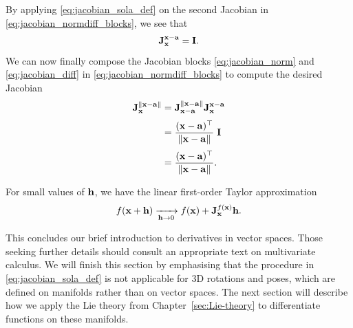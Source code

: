 \begin{example}[frametitle=Computing the Jacobian $\jac{\norm{\vecx - \veca}}{\vecx}$]
\begin{subequations}
\end{subequations}
By applying \eqref{eq:jacobian_sola_def} on the second Jacobian in \eqref{eq:jacobian_normdiff_blocks}, we see that
\begin{equation} \label{eq:jacobian_diff}
  \jac{\vecx - \veca}{\vecx} = \matI.
\end{equation}
We can now finally compose the Jacobian blocks \eqref{eq:jacobian_norm} and \eqref{eq:jacobian_diff} in \eqref{eq:jacobian_normdiff_blocks} to compute the desired Jacobian 
\begin{subequations} \label{eq:jacobian_normdiff}
\begin{align}
  \jac{\norm{\vecx - \veca}}{\vecx} 
  &= \jac{\norm{\vecx - \veca}}{\vecx - \veca} \jac{\vecx - \veca}{\vecx}\\[0.3em]
  &= \frac{(\vecx - \veca)\trans}{\norm{\vecx - \veca}} \; \matI\\[0.3em]
  &= \frac{(\vecx - \veca)\trans}{\norm{\vecx - \veca}}.
\end{align}
\end{subequations}
\end{example}

For small values of $\vech$, we have the linear first-order Taylor approximation
\begin{equation} \label{eq:linear-approximation}
  f(\vecx + \vech) \xrightarrow[\vech \to 0]{} f(\vecx) + \jac{f(\vecx)}{\vecx} \vech.
\end{equation}

This concludes our brief introduction to derivatives in vector spaces.
Those seeking further details should consult an appropriate text on multivariate calculus.
We will finish this section by emphasising that the procedure in \eqref{eq:jacobian_sola_def} is not applicable for 3D rotations and poses, which are defined on manifolds rather than on vector spaces.
The next section will describe how we apply the Lie theory from Chapter~\ref{sec:Lie-theory} to differentiate functions on these manifolds.

